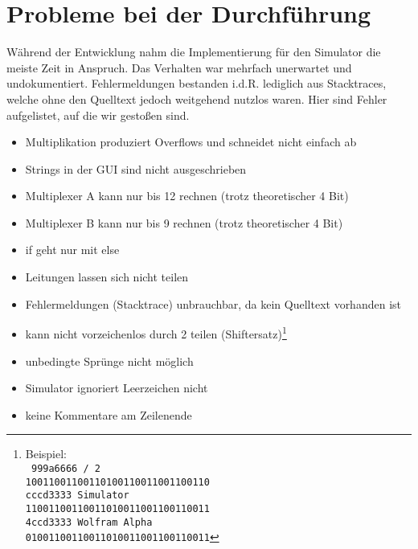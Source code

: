 \section{Probleme bei der Durchführung}
\label{section:Dokumentation-BenchmarkBewertung-Probleme}

Während der Entwicklung nahm die Implementierung für den Simulator die meiste Zeit in Anspruch. Das Verhalten war mehrfach unerwartet und undokumentiert. Fehlermeldungen bestanden i.d.R. lediglich aus Stacktraces, welche ohne den Quelltext jedoch weitgehend nutzlos waren. Hier sind Fehler aufgelistet, auf die wir gestoßen sind.

\begin{itemize}
    \item Multiplikation produziert Overflows und schneidet nicht einfach ab
    \item Strings in der GUI sind nicht ausgeschrieben
    \item Multiplexer A kann nur bis 12 rechnen (trotz theoretischer 4 Bit)
    \item Multiplexer B kann nur bis 9 rechnen (trotz theoretischer 4 Bit)
    \item if geht nur mit else
    \item Leitungen lassen sich nicht teilen
    \item Fehlermeldungen (Stacktrace) unbrauchbar, da kein Quelltext vorhanden ist
    \item kann nicht vorzeichenlos durch 2 teilen (Shiftersatz)\footnote{Beispiel:\\
\texttt{
999a6666 / 2\\
10011001100110100110011001100110\\
cccd3333 Simulator\\
11001100110011010011001100110011\\
4ccd3333 Wolfram Alpha\\
01001100110011010011001100110011}}
    \item unbedingte Sprünge nicht möglich
    \item Simulator ignoriert Leerzeichen nicht
    \item keine Kommentare am Zeilenende
\end{itemize}
